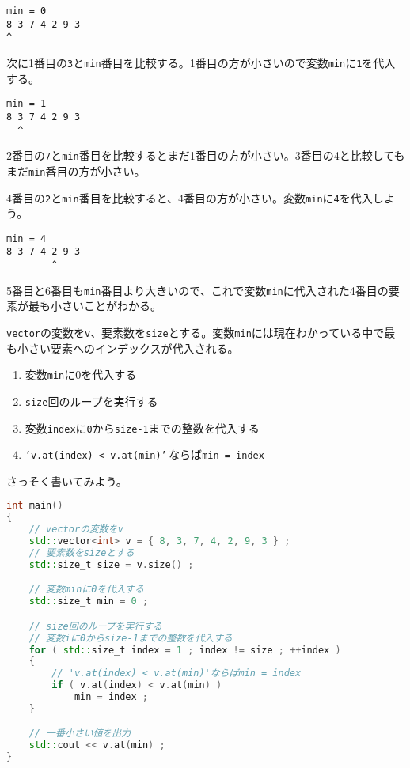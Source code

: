 \begin{lstlisting}[style=terminal]
min = 0
8 3 7 4 2 9 3
^
\end{lstlisting}

次に1番目の\texttt{3}と\texttt{min}番目を比較する。1番目の方が小さいので変数\texttt{min}に\texttt{1}を代入する。

\begin{lstlisting}[style=terminal]
min = 1
8 3 7 4 2 9 3
  ^
\end{lstlisting}

2番目の\texttt{7}と\texttt{min}番目を比較するとまだ1番目の方が小さい。3番目の4と比較してもまだ\texttt{min}番目の方が小さい。

4番目の\texttt{2}と\texttt{min}番目を比較すると、4番目の方が小さい。変数\texttt{min}に\texttt{4}を代入しよう。

\begin{lstlisting}[style=terminal]
min = 4
8 3 7 4 2 9 3
        ^
\end{lstlisting}

5番目と6番目も\texttt{min}番目より大きいので、これで変数\texttt{min}に代入された4番目の要素が最も小さいことがわかる。

\texttt{vector}の変数を\texttt{v}、要素数を\texttt{size}とする。変数\texttt{min}には現在わかっている中で最も小さい要素へのインデックスが代入される。

\begin{enumerate}
\def\labelenumi{\arabic{enumi}.}
\item
  変数\texttt{min}に0を代入する
\item
  \texttt{size}回のループを実行する
\item
  変数\texttt{index}に\texttt{0}から\texttt{size-1}までの整数を代入する
\item
  \texttt{'v.at(index) < v.at(min)'}\,ならば\texttt{min = index}
\end{enumerate}

さっそく書いてみよう。

\begin{lstlisting}[language={C++}]
int main()
{
    // vectorの変数をv
    std::vector<int> v = { 8, 3, 7, 4, 2, 9, 3 } ;
    // 要素数をsizeとする
    std::size_t size = v.size() ;

    // 変数minに0を代入する
    std::size_t min = 0 ;

    // size回のループを実行する
    // 変数iに0からsize-1までの整数を代入する
    for ( std::size_t index = 1 ; index != size ; ++index )
    {
        // 'v.at(index) < v.at(min)'ならばmin = index
        if ( v.at(index) < v.at(min) )
            min = index ;
    }

    // 一番小さい値を出力
    std::cout << v.at(min) ;
}
\end{lstlisting}


